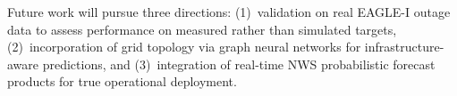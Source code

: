 \documentclass[conference]{IEEEtran}
\begin{document}
Future work will pursue three directions: (1)~validation on real EAGLE-I outage data to assess performance on measured rather than simulated targets, (2)~incorporation of grid topology via graph neural networks for infrastructure-aware predictions, and (3)~integration of real-time NWS probabilistic forecast products for true operational deployment.



\end{document}
